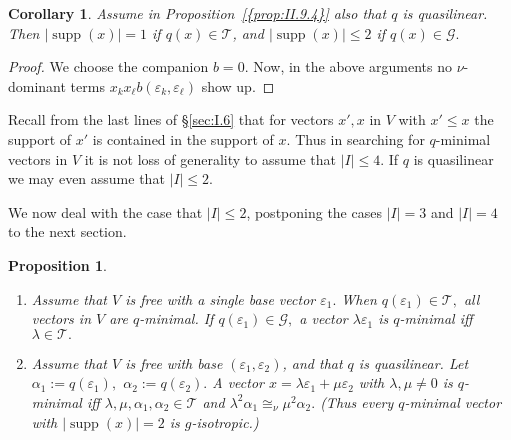 \documentclass [12pt,a4paper,reqno]{amsart}
\newtheorem{cor}[thm]{Corollary}
\newtheorem{prop}[thm]{Proposition}
\begin{document}
\begin{cor}\label{cor:II.9.5}
Assume in {Proposition~\ref{{prop:II.9.4}}} also that $q$ is quasilinear. Then $|{\operatorname{supp}} (x)|=1$ if $q(x)\in {\mathcal T}$, and $|{\operatorname{supp}} (x)|
\le 2$ if $q(x)\in{\mathcal G}.$\end{cor}

\begin{proof}
We choose the companion $b=0.$ Now, in the above  arguments   no $\nu$-dominant terms $x _kx _\ell b(
{\varepsilon}_k,{\varepsilon}_\ell)$ show up.\end{proof}

Recall from the last lines of \S\ref{sec:I.6} that for  vectors $x',x$ in $V$ with $x' \leq x$ the support of $x'$ is contained in the support of $x$.
Thus in searching for $q$-minimal vectors in $V$ it is not loss of generality to assume that
$|I| \leq 4$. If $q$ is quasilinear  we may even assume that $|I| \leq 2$.

We now deal with the case that $|I| \leq 2$, postponing the cases  $|I| = 3$ and $|I| = 4$ to the next section.

\begin{prop}\label{prop:II.9.6}
{}\quad

\begin{enumerate}
\item[a)] Assume that $V$ is free with a single  base vector ${\varepsilon}_1.$ When $q({\varepsilon}_1)\in{\mathcal T},$ all
vectors in $V$ are $q$-minimal. If $q({\varepsilon}_1)\in{\mathcal G},$ a vector ${\lambda} {\varepsilon}_1$ is $q$-minimal iff
${\lambda} \in{\mathcal T}.$ {\vskip 1.5mm \noindent}

\item[b)] Assume that $V$ is free with base $({\varepsilon}_1,{\varepsilon}_2)$, and that $q$ is quasilinear. Let
${\alpha} _1:=q({\varepsilon}_1),$ ${\alpha} _2:=q({\varepsilon}_2).$ A vector $x={\lambda} {\varepsilon}_1+\mu{\varepsilon}_2$ with
${\lambda} ,\mu\ne0$ is $q$-minimal iff ${\lambda} ,\mu,{\alpha} _1,{\alpha} _2\in{\mathcal T}$ and ${\lambda} ^2{\alpha} _1\cong_\nu \mu^2
{\alpha} _2.$ (Thus every $q$-minimal vector with $|{\operatorname{supp}} (x)|=2$ is $g$-isotropic.)
\end{enumerate}
\end{prop}
\end{document}
